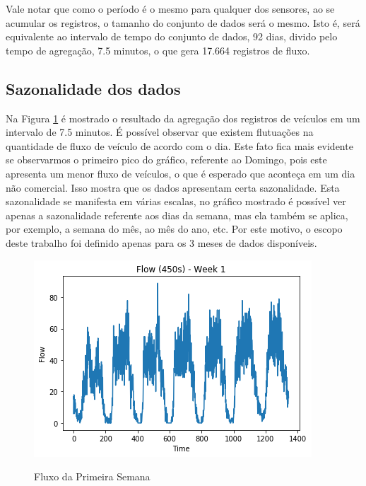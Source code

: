 Vale notar que como o período é o mesmo para qualquer dos sensores, ao se acumular os registros, o tamanho do conjunto de dados será o mesmo. Isto é, será equivalente ao intervalo de tempo do conjunto de dados, 92 dias, divido pelo tempo de agregação, 7.5 minutos, o que gera 17.664 registros de fluxo.

\subsection{Sazonalidade dos dados}


Na Figura \ref{figure:flow_discution} é mostrado o resultado da agregação dos registros de veículos em um intervalo de 7.5 minutos. É possível observar que existem flutuações na quantidade de fluxo de veículo de acordo com o dia. Este fato fica mais evidente se observarmos o primeiro pico do gráfico, referente ao Domingo, pois este apresenta um menor fluxo de veículos, o que é esperado que aconteça em um dia não comercial. Isso mostra que os dados apresentam certa sazonalidade. Esta sazonalidade se manifesta em várias escalas, no gráfico mostrado é possível ver apenas a sazonalidade referente aos dias da semana, mas ela também se aplica, por exemplo, a semana do mês, ao mês do ano, etc. Por este motivo, o escopo deste trabalho foi definido apenas para os 3 meses de dados disponíveis. 


\begin{figure}
    \centering
    \includegraphics[scale=1]{monography/img/flows/flow_450_week_01.png}
    \label{figure:flow_discution}
    \caption[Fluxo da Primeira Semana]{Fluxo da Primeira Semana}
\end{figure}

